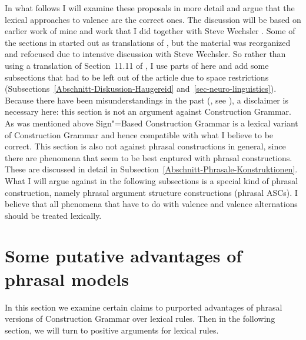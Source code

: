 In what follows I will examine these proposals in more detail and argue that the lexical approaches
to valence are the correct ones. The discussion will be based on earlier work of mine
\citep{Mueller2006d,Mueller2007d,MuellerPersian} and work that I did together with Steve Wechsler
\citep{MWArgSt,MWArgStReply}. Some of the sections in \citet{MWArgSt} started out as translations of
\citet{MuellerGTBuch2}, but the material was reorganized and refocused due to intensive discussion
with Steve Wechsler. So rather than using a translation of Section~11.11 of ,
I use parts of  here and add some subsections that had to be left out of the article
due to space restrictions (Subsections~\ref{Abschnitt-Diskussion-Haugereid} and~\ref{sec-neuro-linguistics}).
Because there have been misunderstandings in the past (\eg {}, see ), a disclaimer is necessary
here: this section is not an argument against Construction Grammar\indexcxg. As was mentioned above
Sign"=Based Construction Grammar is a lexical variant of Construction Grammar and hence compatible
with what I believe to be correct. This section is also not against phrasal constructions in
general, since there are phenomena that seem to be best captured with phrasal constructions. These are
discussed in detail in Subsection~\ref{Abschnitt-Phrasale-Konstruktionen}. What I will argue against in
the following subsections is a special kind of phrasal construction, namely phrasal argument
structure constructions (phrasal ASCs). I believe that all phenomena that have to do with valence and valence
alternations should be treated lexically.




\addlines
\section{Some putative advantages of phrasal models}
\label{Abschnitt-Stoepselei}
%

In this section we examine certain claims to purported advantages of phrasal versions of Construction Grammar over lexical rules.  
Then in the following section, we will turn to positive arguments for lexical rules. 

